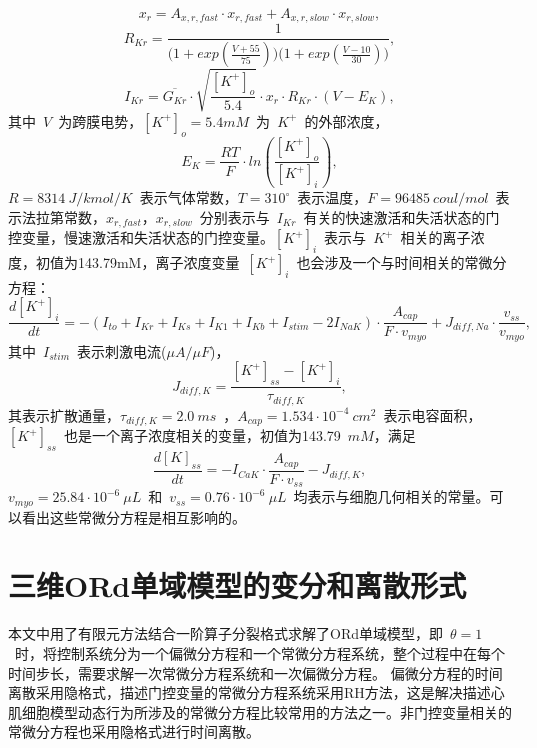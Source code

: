 \documentclass[twoside,UTF8]{nputhesis}
\begin{document}
\begin{equation*}
x_r=A_{x,r,fast}\cdot x_{r,fast}+A_{x,r,slow}\cdot x_{r,slow},
\end{equation*}
\begin{equation*}
R_{Kr}=\frac{1}{\big(1+exp(\frac{V+55}{75})\big)\big(1+exp(\frac{V-10}{30})\big)},
\end{equation*}
\begin{equation*}
I_{Kr}=\overline{G_{Kr}}\cdot \sqrt{\frac{[K^+]_o}{5.4}}\cdot x_r\cdot R_{Kr}\cdot (V-E_K),
\end{equation*}
其中~$V$~为跨膜电势，$[K^+]_o=5.4mM$~为~$K^+$~的外部浓度，
\begin{equation*}
E_{K}=\frac{RT}{F}\cdot ln(\frac{[K^+]_o}{[K^+]_i}),
\end{equation*}
$R=8314~J/kmol/K$~表示气体常数，$T=310^\circ$~表示温度，$F=96485~coul/mol$~表示法拉第常数，$x_{r,fast}$，$x_{r,slow}$~分别表示与~$I_{Kr}$~有关的快速激活和失活状态的门控变量，慢速激活和失活状态的门控变量。$[K^+]_i$~表示与~$K^+$~相关的离子浓度，初值为143.79mM，离子浓度变量~$[K^+]_i$~也会涉及一个与时间相关的常微分方程：
\begin{equation*}
\frac{d[K^+]_i}{dt}=-(I_{to}+I_{Kr}+I_{Ks}+I_{K1}+I_{Kb}+I_{stim}-2I_{NaK})\cdot\frac{A_{cap}}{F\cdot v_{myo}}+J_{diff,Na}\cdot\frac{v_{ss}}{v_{myo}},
\end{equation*}
其中~$I_{stim}$~表示刺激电流($\mu A/\mu F$)，
\begin{equation*}
J_{diff,K}=\frac{[K^+]_{ss}-[K^+]_i}{\tau_{diff,K}},
\end{equation*}
其表示扩散通量，$\tau_{diff,K}=2.0~ms$~，$A_{cap}=1.534\cdot10^{-4}~cm^2$~表示电容面积，
$[K^+]_{ss}$~也是一个离子浓度相关的变量，初值为143.79~$mM$，满足
\begin{equation*}
\frac{d[K]_{ss}}{dt}=-I_{CaK}\cdot\frac{A_{cap}}{F\cdot v_{ss}}-J_{diff,K},
\end{equation*}
$v_{myo}=25.84\cdot10^{-6}~\mu L$~和~$v_{ss}=0.76\cdot10^{-6}~\mu L$~均表示与细胞几何相关的常量。可以看出这些常微分方程是相互影响的。


\section{三维ORd单域模型的变分和离散形式}
本文中用了有限元方法结合一阶算子分裂格式求解了ORd单域模型，即~$\theta=1$~时，将控制系统分为一个偏微分方程和一个常微分方程系统，整个过程中在每个时间步长，需要求解一次常微分方程系统和一次偏微分方程。
偏微分方程的时间离散采用隐格式，描述门控变量的常微分方程系统采用RH方法\cite{RL1978,RL1985}，这是解决描述心肌细胞模型动态行为所涉及的常微分方程比较常用的方法之一。非门控变量相关的常微分方程也采用隐格式进行时间离散。
\end{document}
